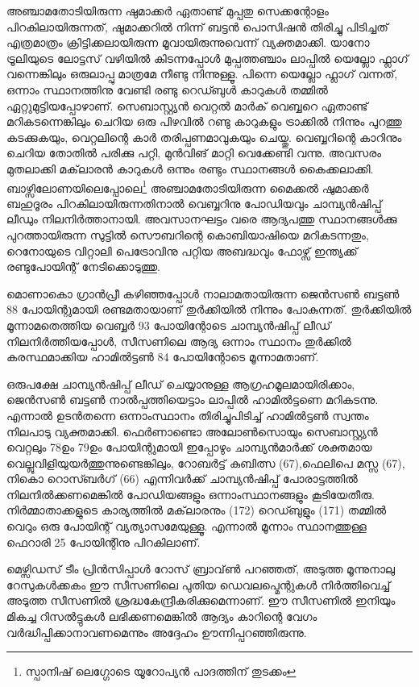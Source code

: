 അഞ്ചാമതോടിയിരുന്ന ഷുമാക്കര്‍ ഏതാണ്ട് മുപ്പതു സെക്കന്റോളം പിറകിലായിരുന്നത്, ഷുമാക്കറില്‍ നിന്ന് ബട്ടന്‍ 
പൊസിഷന്‍ തിരിച്ചു പിടിച്ചത് എത്രമാത്രം ക്രിട്ടിക്കലായിരുന്ന മൂവായിരുന്നുവെന്ന് വ്യക്തമാക്കി. യാനോ ട്രൂലിയുടെ 
ലോട്ടസ് വഴിയില്‍ കിടന്നപ്പോള്‍ മുപ്പത്തഞ്ചാം ലാപ്പില്‍ യെല്ലോ ഫ്ലാഗ് വന്നെങ്കിലും ഒരുലാപ്പു മാത്രമേ നീണ്ടു നിന്നുള്ളൂ. 
പിന്നെ യെല്ലോ ഫ്ലാഗ് വന്നത്, ഒന്നാം സ്ഥാനത്തിനു വേണ്ടി രണ്ടു റെഡ്ബുള്‍ കാറുകള്‍ തമ്മില്‍ ഏറ്റുമുട്ടിയപ്പോഴാണ്. 
സെബാസ്റ്റ്യന്‍ വെറ്റല്‍ മാര്‍ക് വെബ്ബറെ ഏതാണ്ട് മറികടന്നെങ്കിലും ചെറിയ ഒരു പിഴവില്‍ റണ്ടു കാറുകളും ട്രാക്കില്‍ 
നിന്നും പുറത്തു കടക്കുകയും, വെറ്റലിന്റെ കാര്‍ തരിപ്പണമാവുകയും ചെയ്തു. വെബ്ബറിന്റെ കാറിനും ചെറിയ തോതില്‍ പരിക്കു 
പറ്റി, മുന്‍വിങ് മാറ്റി വെക്കേണ്ടി വന്നു. അവസരം മുതലാക്കി മക്‌ലാരന്‍ കാറുകള്‍ ഒന്നും രണ്ടും സ്ഥാനങ്ങള്‍ കൈക്കലാക്കി. 
ബാഴ്സിലോണയിലെപ്പോലെ\footnote{സ്പാനിഷ് ലെഗ്ഗോടെ യൂറോപ്യന്‍ പാദത്തിന് തുടക്കം} അഞ്ചാമതോടിയിരുന്ന മൈക്കല്‍ ഷുമാക്കര്‍ ബഹുദൂരം പിറകിലായിരുന്നതിനാല്‍ വെബ്ബറിനു 
പോഡിയവും ചാമ്പ്യന്‍ഷിപ്പ് ലീഡും നിലനിര്‍ത്താനായി. അവസാനഘട്ടം വരെ ആദ്യപത്തു സ്ഥാനങ്ങള്‍ക്കു പുറത്തായിരുന്ന 
സുട്ടില്‍ സൌബറിന്റെ കൊബിയാഷിയെ മറികടന്നതും, റെനോയുടെ വിറ്റാലി പെട്രോവിനു പറ്റിയ അബദ്ധവും ഫോഴ്സ് 
ഇന്ത്യക്ക് രണ്ടുപോയിന്റ് നേടിക്കൊടുത്തു.

മൊണാകൊ ഗ്രാന്‍പ്രീ കഴിഞ്ഞപ്പോള്‍ നാലാമതായിരുന്ന ജെന്‍സണ്‍ ബട്ടണ്‍ 88 പോയിന്റുമായി രണ്ടമതായാണ് 
തുര്‍ക്കിയില്‍ നിന്നും പോകുന്നത്. തുര്‍ക്കിയില്‍ മൂന്നാമതെത്തിയ വെബ്ബര്‍ 93 പോയിന്റോടെ ചാമ്പ്യന്‍ഷിപ്പ് ലീഡ് 
നിലനിര്‍ത്തിയപ്പോള്‍, സീസണിലെ ആദ്യ ഒന്നാം സ്ഥാനം തുര്‍ക്കില്‍ കരസ്ഥമാക്കിയ ഹാമില്‍ട്ടണ്‍ 84 പോയിന്റോടെ 
മൂന്നാമതാണ്.

ഒരുപക്ഷേ ചാമ്പ്യന്‍ഷിപ്പ് ലീഡ് ചെയ്യാനുള്ള ആഗ്രഹമൂലമായിരിക്കാം, ജെന്‍സണ്‍ ബട്ടണ്‍ നാല്‍പ്പത്തിയെട്ടാം ലാപ്പില്‍ 
ഹാമില്‍ട്ടണെ മറികടന്നു. എന്നാല്‍ ഉടന്‍തന്നെ ഒന്നാംസ്ഥാനം തിരിച്ചുപിടിച്ച് ഹാമില്‍ട്ടണ്‍ സ്വന്തം നിലപാടു വ്യക്തമാക്കി.
ഫെര്‍ണാണ്ടൊ അലോണ്‍സൊയും സെബാസ്റ്റ്യന്‍ വെറ്റലും 78ഉം 79ഉം പോയിന്റുമായി ഇപ്പോഴും ചാമ്പ്യന്‍മാര്‍ക്ക് 
ശക്തമായ വെല്ലുവിളിയുയര്‍ത്തുന്നുണ്ടെങ്കിലും, റോബര്‍ട്ട് കുബിത്സ (67),ഫെലിപെ മസ്സ (67), നികൊ റൊസ്ബര്‍ഗ് (66)
എന്നിവര്‍ക്ക് ചാമ്പ്യന്‍ഷിപ്പ് പോരാട്ടത്തില്‍ നിലനില്‍ക്കണമെങ്കില്‍ പോഡിയങ്ങളും ഒന്നാംസ്ഥാനങ്ങളും കൂടിയേതീരു. 
നിര്‍മ്മാതാക്കളുടെ കാര്യത്തില്‍ മക്‌ലാരനും (172) റെഡ്ബുളും (171) തമ്മില്‍ വെറും ഒരു പോയിന്റ് വ്യത്യാസമേയുള്ളൂ.
എന്നാല്‍ മൂന്നാം സ്ഥാനത്തുള്ള ഫെറാരി 25 പോയിന്റിനു പിറകിലാണ്.

മെഴ്സിഡസ് ടീം പ്രിന്‍സിപ്പാള്‍ റോസ് ബ്രാവ്‌ണ്‍ പറഞ്ഞത്, അടുത്ത മൂന്നുനാലു റേസുകള്‍ക്കകം ഈ സീസണിലെ പുതിയ
ഡെവലപ്മെന്റുകള്‍ നിര്‍ത്തിവെച്ച് അടുത്ത സീസണില്‍ ശ്രദ്ധകേന്ദ്രീകരിക്കുമെന്നാണ്. ഈ സീസണില്‍ ഇനിയും മികച്ച 
റിസല്‍ട്ടുകള്‍ ലഭിക്കണമെങ്കില്‍ ആദ്യം കാറിന്റെ വേഗം വര്‍ദ്ധിപ്പിക്കാനാവണമെന്നും അദ്ദേഹം ഊന്നിപ്പറഞ്ഞിരുന്നു.

